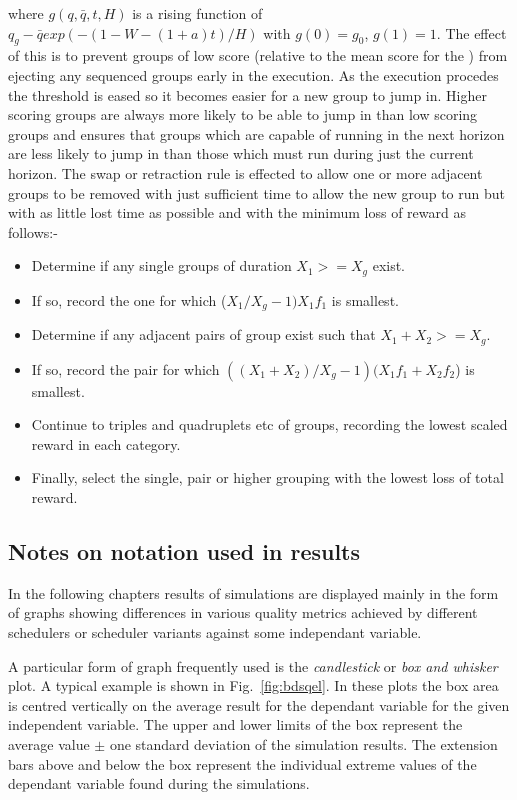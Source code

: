\begin{itemize}
where $g(q,\bar{q},t,H)$ is a rising function of $q_g-\bar{q}exp(-(1-W-(1+a)t)/H)$ with $g(0) = g_0$, $g(1) = 1$. The effect of this is to prevent groups of low score (relative to the mean score for the \echelon) from ejecting any sequenced groups early in the execution. As the execution procedes the threshold is eased so it becomes easier for a new group to jump in. Higher scoring groups are always more likely to be able to jump in than low scoring groups and ensures that groups which are capable of running in the next horizon are less likely to jump in than those which must run during just the current horizon. The swap or retraction rule is effected to allow one or more adjacent groups to be removed with just sufficient time to allow the new group to run but with as little lost time as possible and with the minimum loss of reward as follows:-


\begin{itemize}  
  \item Determine if any single groups of duration $X_1 >= X_g$ exist. 
  \item If so, record the one for which ($X_1/X_g-1)X_1f_1$ is smallest.
  \item Determine if any adjacent pairs of group exist such that $X_1+X_2 >= X_g$.
  \item If so, record the pair for which $((X_1+X_2)/X_g-1)(X_1f_1+X_2f_2$) is smallest.
  \item Continue to triples and quadruplets etc of groups, recording the lowest scaled reward in each category.
  \item Finally, select the single, pair or higher grouping with the lowest loss of total reward.
\end{itemize}

\end{itemize}

\subsection{Notes on notation used in results}

In the following chapters results of simulations are displayed mainly in the form of graphs showing differences in various quality metrics achieved by different schedulers or scheduler variants against some independant variable.

A particular form of graph frequently used is the \emph{candlestick} or \emph{box and whisker} plot. A typical example is shown in Fig.~\ref{fig:bdsqel}. In these plots the box area is centred vertically on the average result for the dependant variable for the given independent variable. The upper and lower limits of the box represent the average value $\pm $ one standard deviation of the simulation results. The extension bars above and below the box represent the individual extreme values of the dependant variable found during the simulations.

